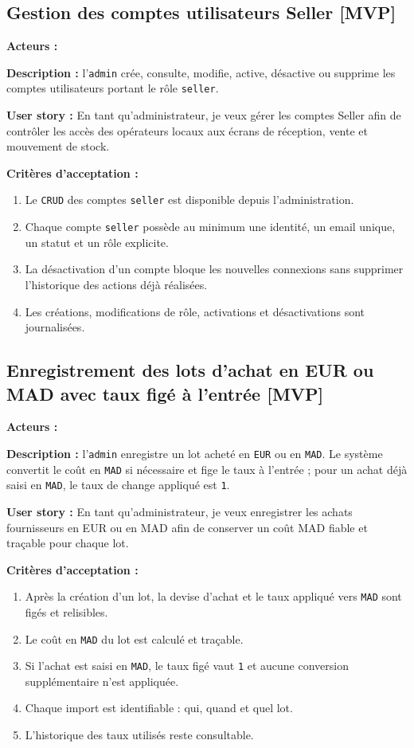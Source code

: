 \documentclass[11pt,a4paper]{scrreprt}
\newcommand{\code}[1]{\texttt{#1}}
\newcommand{\phase}[1]{\textbf{\textcolor{SplinAmber}{#1}}}
\newcommand{\actorbadge}[1]{\highlight{\code{#1}}}
\begin{document}
\subsection{Gestion des comptes utilisateurs Seller \phase{[MVP]}}
\textbf{Acteurs :} \actorbadge{ADMIN}

\textbf{Description :} l'\code{admin} crée, consulte, modifie, active, désactive ou supprime les comptes utilisateurs portant le rôle \code{seller}.

\textbf{User story :} En tant qu'administrateur, je veux gérer les comptes Seller afin de contrôler les accès des opérateurs locaux aux écrans de réception, vente et mouvement de stock.

\textbf{Critères d'acceptation :}
\begin{enumerate}
  \item Le \code{CRUD} des comptes \code{seller} est disponible depuis l'administration.
  \item Chaque compte \code{seller} possède au minimum une identité, un email unique, un statut et un rôle explicite.
  \item La désactivation d'un compte bloque les nouvelles connexions sans supprimer l'historique des actions déjà réalisées.
  \item Les créations, modifications de rôle, activations et désactivations sont journalisées.
\end{enumerate}

\subsection{Enregistrement des lots d'achat en EUR ou MAD avec taux figé à l'entrée \phase{[MVP]}}
\textbf{Acteurs :} \actorbadge{ADMIN}

\textbf{Description :} l'\code{admin} enregistre un lot acheté en \code{EUR} ou en \code{MAD}. Le système convertit le coût en \code{MAD} si nécessaire et fige le taux à l'entrée ; pour un achat déjà saisi en \code{MAD}, le taux de change appliqué est \code{1}.

\textbf{User story :} En tant qu'administrateur, je veux enregistrer les achats fournisseurs en EUR ou en MAD afin de conserver un coût MAD fiable et traçable pour chaque lot.

\textbf{Critères d'acceptation :}
\begin{enumerate}
  \item Après la création d'un lot, la devise d'achat et le taux appliqué vers \code{MAD} sont figés et relisibles.
  \item Le coût en \code{MAD} du lot est calculé et traçable.
  \item Si l'achat est saisi en \code{MAD}, le taux figé vaut \code{1} et aucune conversion supplémentaire n'est appliquée.
  \item Chaque import est identifiable : qui, quand et quel lot.
  \item L'historique des taux utilisés reste consultable.
\end{enumerate}
\end{document}
